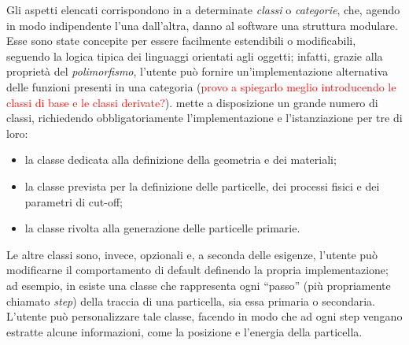 Gli aspetti elencati corrispondono in \geant{} a determinate \emph{classi} o \emph{categorie}, che, agendo in modo indipendente l'una dall'altra, danno al software una struttura modulare.
Esse sono state concepite per essere facilmente estendibili o modificabili, seguendo la logica tipica dei linguaggi orientati agli oggetti; infatti, grazie alla proprietà del \emph{polimorfismo}, l'utente può fornire un'implementazione alternativa delle funzioni presenti in una categoria (\textcolor{red}{provo a spiegarlo meglio introducendo le classi di base e le classi derivate?}).
\geant{} mette a disposizione un grande numero di classi, richiedendo obbligatoriamente l'implementazione e l'istanziazione per tre di loro: 
\begin{itemize}
	\item la classe dedicata alla definizione della geometria e dei materiali;
	\item la classe prevista per la definizione delle particelle, dei processi fisici e dei parametri di cut-off;
	\item la classe rivolta alla generazione delle particelle primarie.
\end{itemize}



Le altre classi sono, invece, opzionali e, a seconda delle esigenze, l'utente può modificarne il comportamento di default definendo la propria implementazione; 
%
ad esempio, in \geant{} esiste una classe che rappresenta ogni ``passo'' (più propriamente chiamato \emph{step}) della traccia di una particella, sia essa primaria o secondaria.
L'utente può personalizzare tale classe, facendo in modo che ad ogni step vengano estratte alcune informazioni, come la posizione e l'energia della particella.


